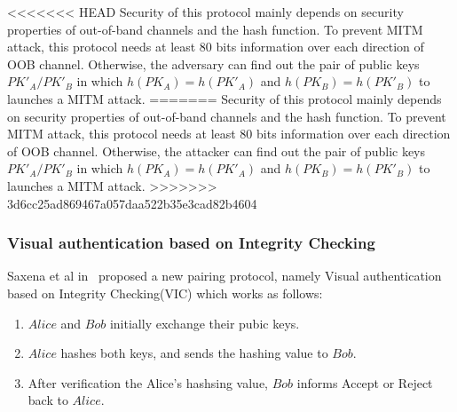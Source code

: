 <<<<<<< HEAD
Security of this protocol mainly depends on security properties of out-of-band channels and the hash function. To prevent MITM attack, this protocol needs at least 80 bits information over each direction of OOB channel. Otherwise, the adversary can find out the pair of public keys $PK'_A/PK'_B$ in which $h(PK_A) = h(PK'_A)$ and $h(PK_B) = h(PK'_B)$ to launches a MITM attack.
=======
Security of this protocol mainly depends on security properties of out-of-band channels and the hash function. To prevent MITM attack, this protocol needs at least 80 bits information over each direction of OOB channel. Otherwise, the attacker can find out the pair of public keys $PK'_A/PK'_B$ in which $h(PK_A) = h(PK'_A)$ and $h(PK_B) = h(PK'_B)$ to launches a MITM attack.
>>>>>>> 3d6cc25ad869467a057daa522b35e3cad82b4604

\subsubsection{Visual authentication based on Integrity Checking}

Saxena et al in~\cite{1624021} proposed a new pairing protocol, namely Visual authentication based on Integrity Checking(VIC) which works as follows:

\begin{enumerate}
\item $Alice$ and $Bob$ initially exchange their pubic keys.
\item $Alice$ hashes both keys, and sends the hashing value to $Bob$. 
\item After verification the Alice's hashsing value, $Bob$ informs Accept or Reject back to $Alice$. 
\end{enumerate}

\begin{center}
\end{center}

